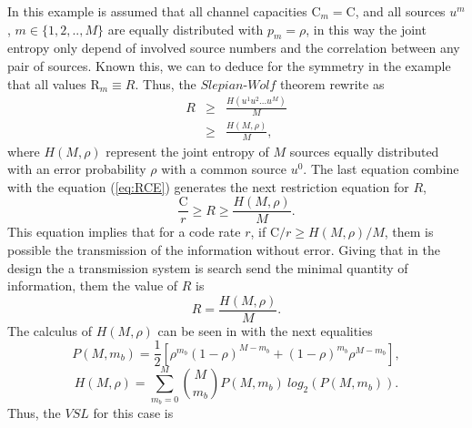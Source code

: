 \begin{example}
In this example is assumed that all channel capacities
$\mathrm{C}_m=\mathrm{C}$, and all sources
$u^m$, $m \in \{1,2,..,M\}$ are equally distributed with $p_m=\rho$, in this way
the joint entropy only depend of involved source numbers and the correlation
between any pair of sources. Known this, we can to deduce for the symmetry in the example that
all values $\mathrm{R}_m \equiv R$.
Thus, the $Slepian$-$Wolf$ theorem rewrite as
\begin{equation} \label{eq:hiper2}
\begin{matrix}
R & \geq & \frac{H(u^1 u^2 ... u^{M})}{M}\\
~          & \geq & \frac{H(M, \rho)}{M},
\end{matrix}
\end{equation}
where $H({M}, \rho)$ represent the joint entropy of ${M}$ sources equally distributed
with an error probability $\rho$ with a common source $u^0$.
The last equation combine with the equation (\ref{eq:RCE}) generates the next restriction equation for $R$,
\begin{equation} \label{eq:hiper21}
\frac{\mathrm{C}}{r} \geq R  \geq \frac{H({M}, \rho)}{{M}}.
\end{equation}
This equation implies that for a code rate $r$, if ${\mathrm{C}}/{r}  \geq {H({M}, \rho)}/{{M}}$, them
is possible the transmission of the information without error.
Giving that in the design the a transmission system  is search send the minimal
quantity of information, them the value of $R$ is
\begin{equation} \label{eq:hiper3}
R  = \frac{H({M}, \rho)}{{M}}.
\end{equation}
The calculus of $H({M}, \rho)$ can be seen in \cite{raheli2011} with the next equalities
\begin{equation} \label{eq:raheli2011a}
P({M},m_b)=\frac{1}{2}[\rho^{m_b}(1-\rho)^{M-m_b}+(1-\rho)^{m_b}{\rho}^{M-m_b}],
\end{equation}
\begin{equation} \label{eq:raheli2011b}
H({M}, \rho)=\sum_{m_b=0}^{M}{\binom{M}{m_b}P({M},m_b)~log_2(P({M},m_b))}.
\end{equation}
Thus, the $VSL$ for this case is
\begin{equation} \label{eq:shannonbiawgnhard4}

\end{equation}
\end{example}
